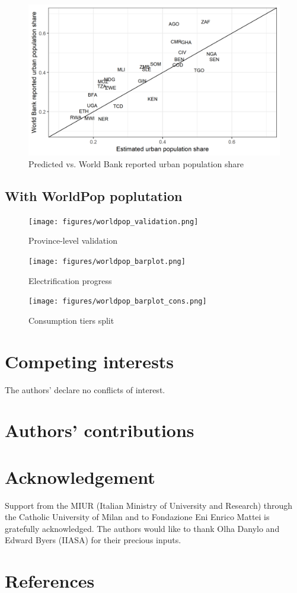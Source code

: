 \documentclass[preprint,12pt]{elsarticle}
\begin{document}
\begin{figure}[H]
    \centering
    \includegraphics[scale=0.8]{figures/urbanvalid.png}
    \caption{Predicted vs. World Bank reported urban population share}
\end{figure}


\subsection*{With WorldPop poplutation}
\begin{figure}[H]
    \centering
    \texttt{[image: figures/worldpop\_validation.png]}
    \caption{Province-level validation}
\end{figure}

\begin{figure}[H]
    \centering
    \texttt{[image: figures/worldpop\_barplot.png]}
    \caption{Electrification progress}
\end{figure}

\begin{figure}[H]
    \centering
    \texttt{[image: figures/worldpop\_barplot\_cons.png]}
    \caption{Consumption tiers split}
\end{figure}


\section*{Competing interests}
The authors' declare no conflicts of interest. 

\section*{Authors' contributions}

\section*{Acknowledgement}
Support from the MIUR (Italian Ministry of University and Research) through the Catholic University of Milan and to Fondazione Eni Enrico Mattei is gratefully acknowledged. The authors would like to thank Olha Danylo and Edward Byers (IIASA) for their precious inputs.

\section*{References}
\begin{footnotesize}

\end{footnotesize}
\end{document}
